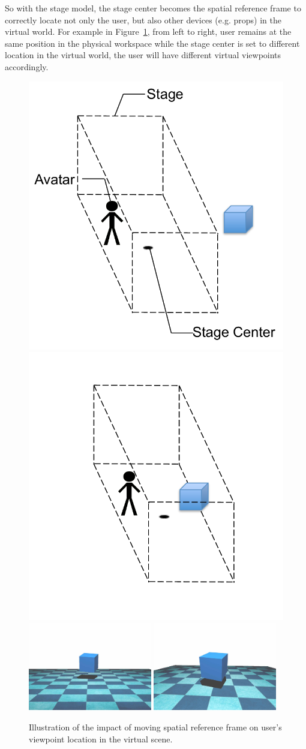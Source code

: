 So with the stage model, the stage center becomes the spatial reference frame to correctly locate not only the user, but also other devices (e.g. props) in the virtual world. For example in Figure~\ref{fig:2_reference}, from left to right, user remains at the same position in the physical workspace while the stage center is set to different location in the virtual world, the user will have different virtual viewpoints accordingly.

\begin{figure}[htb]
  \centering
  \includegraphics[width=.4\textwidth]{figures/ch2/referenceframe_1}
  \includegraphics[width=.4\textwidth]{figures/ch2/referenceframe_2}
  \includegraphics[width=0.48\textwidth]{figures/ch2/ref_1}
  \includegraphics[width=0.48\textwidth]{figures/ch2/ref_2}
  \caption{\label{fig:2_reference}Illustration of the impact of moving spatial reference frame on user's viewpoint location in the virtual scene.}
\end{figure}

